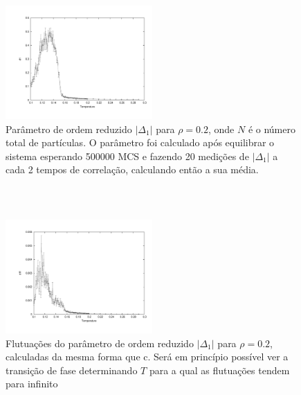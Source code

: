 \documentclass[11pt]{beamer}
\begin{document}
\begin{frame}
\frametitle{\insertsection \\ {\small \insertsubsection}}
\begin{figure}
	\centering
		\includegraphics[width=0.5\textwidth, clip, trim = 1.7cm 1.5cm 1cm 1cm]{images/0.2/d1}
	\caption{{\footnotesize Parâmetro de ordem reduzido $|\Delta_1|$ para $\rho = 0.2$, onde $N$ é o número total de partículas. O parâmetro foi calculado após equilibrar o sistema esperando 500000 MCS e fazendo 20 medições de $|\Delta_1|$ a cada 2 tempos de correlação, calculando então a sua média.}}
	\label{fig:17}
\end{figure}
\end{frame}

\begin{frame}
\frametitle{\insertsection \\ {\small \insertsubsection}}
\begin{figure}
	\centering
		\includegraphics[width=0.5\textwidth, clip, trim = 1.7cm 1.5cm 1cm 1cm]{images/0.2/d1f}
	\caption{{\footnotesize Flutuações do parâmetro de ordem reduzido $|\Delta_1|$ para $\rho = 0.2$, calculadas da mesma forma que c. Será em princípio possível ver a transição de fase determinando $T$ para a qual as flutuações tendem para infinito}}
	\label{fig:18}
\end{figure}
\end{frame}
\end{document}
